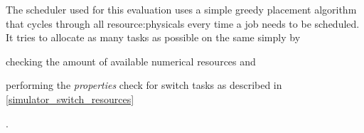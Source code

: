 The scheduler used for this evaluation uses a simple greedy placement algorithm that cycles through all \glspl{resource:physical} every time a job needs to be scheduled.
It tries to allocate as many tasks as possible on the same  simply by
\begin{mylist}
    \item checking the amount of available numerical resources and
    \item performing the \textit{properties} check for switch tasks as described in \autoref{simulator_switch_resources}
\end{mylist}.